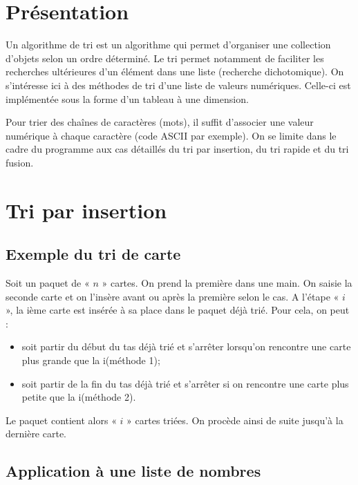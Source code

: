 \documentclass[10pt,fleqn]{article} %
\begin{document}


\section{Présentation}
Un algorithme de tri est un algorithme qui permet d'organiser une collection d'objets selon un ordre déterminé. Le tri permet notamment de faciliter les recherches ultérieures d'un élément dans une liste (recherche dichotomique).
On s'intéresse ici à des méthodes de tri d'une liste de valeurs numériques. Celle-ci est implémentée sous la forme d'un tableau à une dimension.

\begin{rem}
Pour trier des chaînes de caractères (mots), il suffit d'associer une valeur numérique à chaque caractère (code ASCII par exemple). 
On se limite dans le cadre du programme aux cas détaillés du tri par insertion, du tri rapide et du tri fusion.
\end{rem}

\section{Tri par insertion}
\subsection{Exemple du tri de carte}

Soit un paquet de « $n$ » cartes. On prend la première dans une main.
On saisie la seconde carte et on l'insère avant ou après la première selon le cas.
A l'étape « $i$ », la ième carte est insérée à sa place dans le paquet déjà trié. 
Pour cela, on peut :
\begin{itemize}
\item soit partir du début du tas déjà trié et s'arrêter lorsqu'on rencontre une carte plus grande que la i\ieme (méthode 1);
\item soit partir de la fin du tas déjà trié et s'arrêter si on rencontre une carte plus petite que la i\ieme (méthode 2).
\end{itemize}
Le paquet contient alors « $i$ » cartes triées. On procède ainsi de suite jusqu'à la dernière carte.

\subsection{Application à une liste de nombres}
\end{document}
